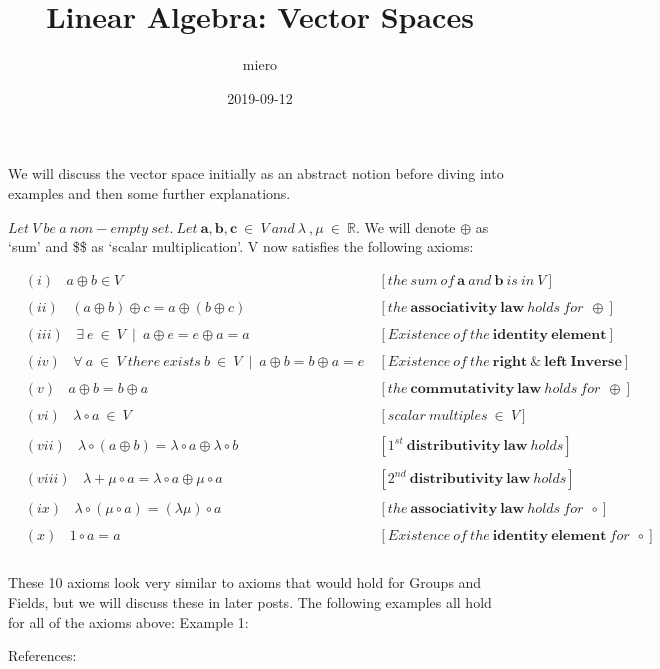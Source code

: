 \documentclass[]{article}
\title{Linear Algebra: Vector Spaces}
\author{miero}
\date{2019-09-12}
\begin{document}
\maketitle

We will discuss the vector space initially as an abstract notion before
diving into examples and then some further explanations.

\(Let\ V\ be\ a\ non-empty\ set.\ Let\ \boldsymbol{a, b,c }\ \in\ V\ and\ \lambda\ , \mu\ \in\ \mathbb{R}.\)
We will denote \(\oplus\) as `sum' and \$\circ\$ as `scalar
multiplication'. V now satisfies the following axioms:

\begin{align}
 &(i)\ \ \ \ a\oplus b \in V \ \                                                               &[the\ sum\ of\ \boldsymbol{a}\ and\ \boldsymbol{b}\ is\ in\ V] \\\\
 &(ii)\ \ \ \ (a\oplus b)\oplus c= a\oplus (b\oplus c)\                                        &[the\ \boldsymbol{associativity\ law}\ holds\ for\ \ \oplus] \\\\
 &(iii)\ \ \ \ \exists\ e\ \in\ V\ \mid\ a\oplus e = e\oplus a = a\                            &[Existence\ of\ the\ \boldsymbol{identity\ element}] \\\\
 &(iv)\ \ \ \ \forall\ a\ \in\ V\ there\ exists\ b\ \in\ V\ \mid\ a\oplus b = b\oplus a = e\   &[Existence\ of\ the\ \boldsymbol{right\ \&\ left\ Inverse}]\\\\
 &(v)\ \ \ \ a\oplus b = b\oplus a\                                                            &[the\ \boldsymbol{commutativity\ law}\ holds\ for\ \ \oplus]\\\\
 &(vi)\ \ \ \ \lambda \circ a\ \in\ V\                                                         &[scalar\ multiples\ \in\ V]\\\\
 &(vii)\ \ \ \ \lambda \circ (a\oplus b)=\lambda \circ a\oplus \lambda \circ b                 &[1^{st}\ \boldsymbol{distributivity\ law}\ holds]\\\\
 &(viii)\ \ \ \ \lambda + \mu \circ a = \lambda \circ a\oplus \mu \circ a                      &[2^{nd}\ \boldsymbol{distributivity\ law}\ holds]\\\\
 &(ix)\ \ \ \ \lambda \circ (\mu \circ a) = (\lambda\mu)\circ a                                &[the\ \boldsymbol{associativity\ law}\ holds\ for\ \ \circ]\\\\
 &(x)\ \ \ \ 1 \circ a = a                                                                     &[Existence\ of\ the\ \boldsymbol{identity\ element}\ for\ \ \circ]\\\\
\end{align}

These 10 axioms look very similar to axioms that would hold for Groups
and Fields, but we will discuss these in later posts. The following
examples all hold for all of the axioms above: Example 1:

References:
\end{document}
